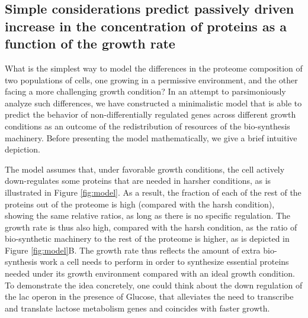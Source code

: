 \subsection{Simple considerations predict passively driven increase in the concentration of proteins as a function of the growth rate}
What is the simplest way to model the differences in the proteome composition of two populations of cells, one growing in a permissive environment, and the other facing a more challenging growth condition?
In an attempt to parsimoniously analyze such differences, we have constructed a minimalistic model that is able to predict the behavior of non-differentially regulated genes across different growth conditions as an outcome of the redistribution of resources of the bio-synthesis machinery.
Before presenting the model mathematically, we give a brief intuitive depiction.

The model assumes that, under favorable growth conditions, the cell actively down-regulates some proteins that are needed in harsher conditions, as is illustrated in Figure \ref{fig:model}.
As a result, the fraction of each of the rest of the proteins out of the proteome is high (compared with the harsh condition), showing the same relative ratios, as long as there is no specific regulation.
The growth rate is thus also high, compared with the harsh condition, as the ratio of bio-synthetic machinery to the rest of the proteome is higher, as is depicted in Figure \ref{fig:model}B.
The growth rate thus reflects the amount of extra bio-synthesis work a cell needs to perform in order to synthesize essential proteins needed under its growth environment compared with an ideal growth condition.
To demonstrate the idea concretely, one could think about the down regulation of the lac operon in the presence of Glucose, that alleviates the need to transcribe and translate lactose metabolism genes and coincides with faster growth.